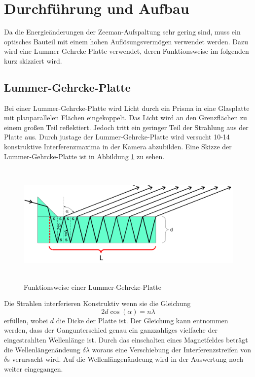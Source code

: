 \section{Durchführung und Aufbau}
\label{sec:Durchführung}
Da die Energieänderungen der Zeeman-Aufspaltung sehr gering sind, muss ein optisches Bauteil mit einem hohen Auflösungsvermögen verwendet werden. Dazu wird eine Lummer-Gehrcke-Platte verwendet, deren Funktionsweise im folgenden kurz skizziert wird.

\subsection{Lummer-Gehrcke-Platte}
Bei einer Lummer-Gehrcke-Platte wird Licht durch ein Prisma in eine Glasplatte mit planparallelen Flächen eingekoppelt. Das Licht wird an den Grenzflächen zu einem großen Teil reflektiert. Jedoch tritt ein geringer Teil der Strahlung aus der Platte aus. Durch justage der Lummer-Gehrcke-Platte wird versucht 10-14 konstruktive Interferenzmaxima in der Kamera abzubilden. Eine Skizze der Lummer-Gehrcke-Platte ist in Abbildung \ref{fig:Lum} zu sehen.

\begin{figure}[H]
  \centering
  \includegraphics[height=6cm]{Bilder/Lummer.png}
  \caption{Funktionsweise einer Lummer-Gehrcke-Platte \cite{V27}}
  \label{fig:Lum}
\end{figure}

Die Strahlen interferieren Konstruktiv wenn sie die Gleichung
\begin{equation}
  2 d \cos(\alpha) = n \lambda
\end{equation}
erfüllen, wobei $d$ die Dicke der Platte ist. Der Gleichung kann entnommen werden, dass der Gangunterschied genau ein ganzzahliges vielfache der eingestrahlten Wellenlänge ist. Durch das einschalten eines Magnetfeldes beträgt die Wellenlängenändeung $\delta \lambda$ woraus eine Verschiebung der Interferenzstreifen von $\delta$s verursacht wird. Auf die Wellenlängenändeung wird in der Auswertung noch weiter eingegangen.

